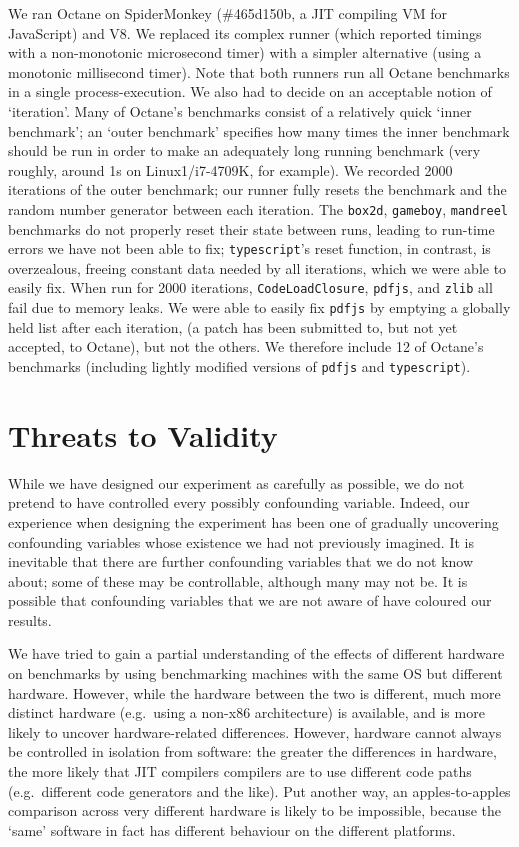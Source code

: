 \documentclass[preprint,numbers,10pt]{sigplanconf}
\newcommand{\bencherthree}{Linux1/i7-4709K\xspace}
\begin{document}
We ran Octane on SpiderMonkey (\#465d150b, a JIT compiling VM for JavaScript) and V8. 
We replaced its complex runner (which reported timings with a non-monotonic
microsecond timer) with a simpler alternative (using a monotonic millisecond
timer). Note that both runners run all Octane benchmarks in a single process-execution.
We also had to decide on an acceptable notion of `iteration'. Many of Octane's
benchmarks consist of a relatively quick `inner benchmark'; an `outer benchmark'
specifies how many times the inner benchmark should be run in order to make an
adequately long running benchmark (very roughly, around 1s on \bencherthree, for
example). We recorded 2000 iterations of the outer benchmark; our runner
fully resets the benchmark and the random number generator between each
iteration. The \texttt{box2d}, \texttt{gameboy}, \texttt{mandreel} benchmarks do
not properly reset their state between runs, leading to run-time errors we have
not been able to fix; \texttt{typescript}'s reset function, in contrast, is
overzealous, freeing constant data needed by all iterations, which we were able
to easily fix. When run for 2000 iterations, \texttt{CodeLoadClosure},
\texttt{pdfjs}, and \texttt{zlib} all fail due to memory leaks. We were able to
easily fix \texttt{pdfjs} by emptying a globally held list after each iteration,
(a patch has been submitted to, but not yet accepted, to Octane), but not the
others. We therefore include 12 of Octane's benchmarks (including lightly
modified versions of \texttt{pdfjs} and \texttt{typescript}).


\section{Threats to Validity}
\label{sec:threats}

While we have designed our experiment as carefully as possible, we do not
pretend to have controlled every possibly confounding variable. Indeed, our
experience when designing the experiment has been one of gradually uncovering
confounding variables whose existence we had not previously imagined. It
is inevitable that there are further confounding variables that we
do not know about; some of these may be controllable, although many may not be.
It is possible that confounding variables that we are not aware of have
coloured our results.

We have tried to gain a partial understanding of the effects of different
hardware on benchmarks by using benchmarking machines with the same OS but
different hardware. However, while the hardware between the two is
different, much more distinct hardware (e.g.~using a non-x86 architecture) is
available, and is more likely to uncover hardware-related differences.
However, hardware cannot always be controlled in isolation from software:
the greater the differences in hardware, the more likely that JIT compilers
compilers are to use different code paths (e.g.~different code generators and
the like). Put another way, an apples-to-apples comparison across very different
hardware is likely to be impossible, because the `same' software in fact has
different behaviour on the different platforms.
\end{document}
